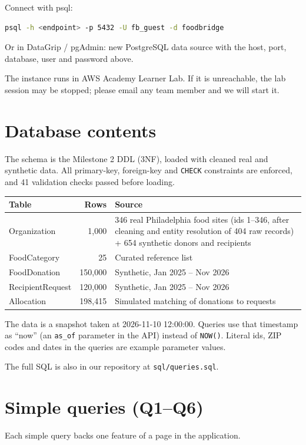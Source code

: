 \documentclass[11pt,letterpaper]{article}
\begin{document}
Connect with psql:
\begin{lstlisting}[language=bash]
psql -h <endpoint> -p 5432 -U fb_guest -d foodbridge
\end{lstlisting}

Or in DataGrip / pgAdmin: new PostgreSQL data source with the host, port, database, user and password above.

The instance runs in AWS Academy Learner Lab. If it is unreachable, the lab session may be stopped; please email any team member and we will start it.

\section*{Database contents}
The schema is the Milestone 2 DDL (3NF), loaded with cleaned real and synthetic data. All primary-key, foreign-key and \texttt{CHECK} constraints are enforced, and 41 validation checks passed before loading.

\begin{center}
\begin{tabularx}{\linewidth}{l r X}
\toprule
\textbf{Table} & \textbf{Rows} & \textbf{Source} \\
\midrule
Organization & 1,000 & 346 real Philadelphia food sites (ids 1--346, after cleaning and entity resolution of 404 raw records) + 654 synthetic donors and recipients \\
FoodCategory & 25 & Curated reference list \\
FoodDonation & 150,000 & Synthetic, Jan 2025 -- Nov 2026 \\
RecipientRequest & 120,000 & Synthetic, Jan 2025 -- Nov 2026 \\
Allocation & 198,415 & Simulated matching of donations to requests \\
\bottomrule
\end{tabularx}
\end{center}

The data is a snapshot taken at 2026-11-10 12:00:00. Queries use that timestamp as ``now'' (an \texttt{as\_of} parameter in the API) instead of \texttt{NOW()}. Literal ids, ZIP codes and dates in the queries are example parameter values.

The full SQL is also in our repository at \texttt{sql/queries.sql}.

\section*{Simple queries (Q1--Q6)}
Each simple query backs one feature of a page in the application.
\end{document}
